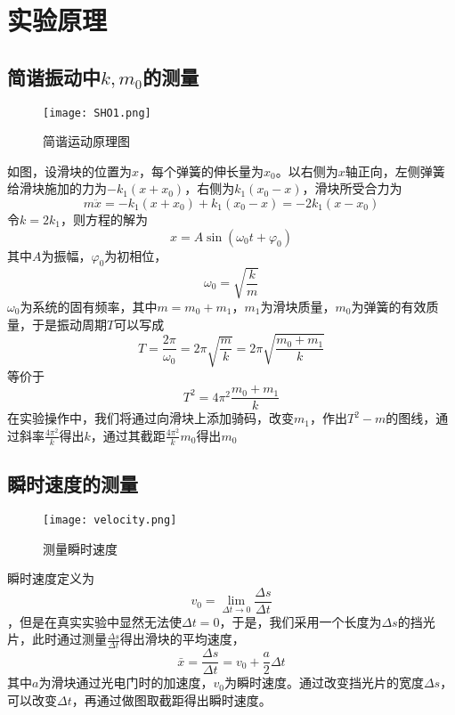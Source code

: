 \documentclass[11pt]{article}
\begin{document}
\section{实验原理}

\subsection{简谐振动中\(k,m_0\)的测量}
	\begin{figure}[H]
			\centering
			\texttt{[image: SHO1.png]}
			\caption{简谐运动原理图}
			\label{fig:SHO theory}
	\end{figure}
			如图，设滑块的位置为\(x\)，每个弹簧的伸长量为\(x_0\)。以右侧为\(x\)轴正向，左侧弹簧给滑块施加的力为\(-k_1(x+x_0)\)，右侧为\(k_1(x_0-x)\)，滑块所受合力为
			\begin{equation*}
				m\ddot{x}=-k_1(x+x_0)+k_1(x_0-x)=-2k_1(x-x_0)
			\end{equation*}
			令\(k=2k_1\)，则方程的解为
			\begin{equation*}
				x=A \sin (\omega_0 t + \varphi_0)
			\end{equation*}
			其中\(A\)为振幅，\(\varphi_0\)为初相位，
			\begin{equation*}
				\omega_0=\sqrt{\frac{k}{m}}
			\end{equation*}
			\(\omega_0\)为系统的固有频率，其中\(m=m_0+m_1\)，\(m_1\)为滑块质量，\(m_0\)为弹簧的有效质量，于是振动周期\(T\)可以写成
			\begin{equation*}
				T=\frac{2\pi}{\omega_0}=2\pi\sqrt{\frac{m}{k}}=2\pi\sqrt{\frac{m_0+m_1}{k}}
			\end{equation*}
			等价于
			\begin{equation*}
				T^2=4\pi^2\frac{m_0+m_1}{k}
			\end{equation*}
			在实验操作中，我们将通过向滑块上添加骑码，改变\(m_1\)，作出\(T^2-m\)的图线，通过斜率\(\frac{4\pi^2}{k}\)得出\(k\)，通过其截距\(\frac{4\pi^2}{k}m_0\)得出\(m_0\)
\subsection{瞬时速度的测量 }
			\begin{figure}[H]
				\centering
				\texttt{[image: velocity.png]}
				\caption{测量瞬时速度}
				\label{fig:SHO theory}
			\end{figure}
			瞬时速度定义为\[v_0=\lim_{\Delta t \to 0}\frac{\Delta s}{\Delta t}\]，但是在真实实验中显然无法使\(\Delta t =0\)，于是，我们采用一个长度为\(\Delta s\)的挡光片，此时通过测量\(\frac{\Delta s}{\Delta t}\)得出滑块的平均速度，
			\begin{equation*}
				\bar{x}=\frac{\Delta s}{\Delta t}=v_0+\frac{a}{2}\Delta t
			\end{equation*}
			其中\(a\)为滑块通过光电门时的加速度，\(v_0\)为瞬时速度。通过改变挡光片的宽度$\Delta s$，可以改变\(\Delta t\)，再通过做图取截距得出瞬时速度。 
\end{document}
